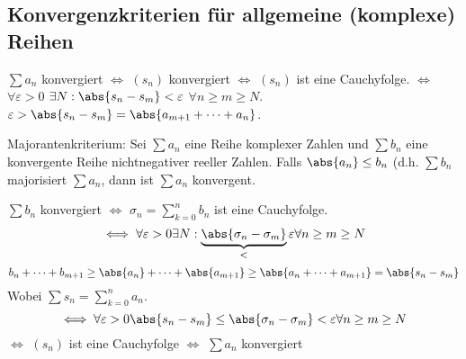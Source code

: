 \subsection{Konvergenzkriterien für allgemeine (komplexe) Reihen}
\begin{Bem}
  $\sum a_n$ konvergiert $\iff$ $(s_n)$ konvergiert $\iff$ $(s_n)$ ist eine Cauchyfolge. $\iff$ $\forall\varepsilon>0$ $\exists N: \abs{s_n-s_m}<\varepsilon$ $\forall n\geq m\geq N$. $\varepsilon>\abs{s_n-s_m}=\abs{a_{m+1}+\cdots+a_n}$.
\end{Bem}
\begin{Kor}
  Majorantenkriterium: Sei $\sum a_n$ eine Reihe komplexer Zahlen und $\sum b_n$ eine konvergente Reihe nichtnegativer reeller Zahlen. Falls $\abs{a_n}\leq b_n$ (d.h. $\sum b_n$ majorisiert $\sum a_n$, dann ist $\sum a_n$ konvergent.
\end{Kor}
\begin{Bew}
  $\sum b_n$ konvergiert $\iff$ $\sigma_n=\sum^n_{k=0} b_n$ ist eine Cauchyfolge.
  \[\iff \forall \varepsilon>0 \exists N:\underbrace{\abs{\sigma_n-\sigma_m}}_<\varepsilon\forall n\geq m\geq N\]
  \[b_n+\cdots+b_{m+1}\geq\abs{a_n}+\cdots+\abs{a_{m+1}}\geq \abs{a_n+\cdots+a_{m+1}}=\abs{s_n-s_m}\]
  Wobei $\sum s_n=\sum^n_{k=0}a_n$.
  \[\iff \forall \varepsilon>0 \abs{s_n-s_m}\leq \abs{\sigma_n-\sigma_m}<\varepsilon\forall n\geq m\geq N\]
  $\iff$ $(s_n)$ ist eine Cauchyfolge $\iff$ $\sum a_n$ konvergiert
\end{Bew}
